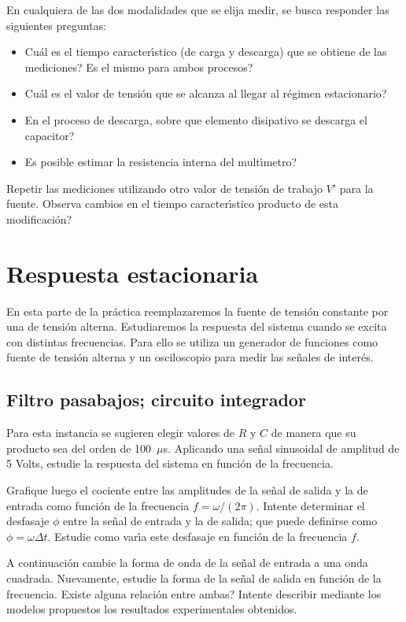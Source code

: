 \documentclass[laboratorio]{guia}
\begin{document}
En cualquiera de las dos modalidades que se elija medir, se busca responder
las siguientes preguntas:
\begin{itemize}
    \item Cu\'al es el tiempo caracter\'\i stico (de carga y descarga) que se 
        obtiene de las  mediciones? Es el mismo para ambos procesos?
    \item Cu\'al es el valor de tensi\'on que se alcanza al llegar al 
        r\'egimen estacionario? 
    \item En el proceso de descarga, sobre que elemento disipativo se 
        descarga el capacitor?
    \item Es posible estimar la resistencia interna del mult\'\i metro? 
\end{itemize}

Repetir las mediciones utilizando otro valor de tensi\'on de trabajo $V'$
para la fuente. Observa cambios en el tiempo caracter\'\i stico producto de
esta modificaci\'on?

\section{Respuesta estacionaria}

En esta parte de la pr\'actica reemplazaremos la fuente de tensi\'on 
constante por una de tensi\'on alterna. Estudiaremos la respuesta del sistema
cuando se excita con distintas frecuencias. Para ello se utiliza un generador
de funciones como fuente de tensi\'on alterna y un osciloscopio para medir
las se\~nales de inter\'es. 

\subsection{Filtro pasabajos; circuito integrador}

Para esta instancia se sugieren elegir valores de $R$ y $C$ de manera que 
su producto sea del orden de 100~$\mu$s. Aplicando una se\~nal sinusoidal de
amplitud de 5 Volts, estudie la respuesta del sistema en funci\'on de la
frecuencia. 

Grafique luego el cociente entre las amplitudes de la se\~nal de salida y
la de entrada como funci\'on de la frecuencia $f = \omega/(2\pi)$. Intente 
determinar el desfasaje $\phi$ entre la se\~nal de entrada y la de salida; que 
puede definirse como $\phi = \omega \Delta t$. Estudie como var\'\i a este 
desfasaje en funci\'on de la frecuencia $f$. 

A continuaci\'on cambie la forma de onda de la se\~nal de entrada a una 
onda cuadrada. Nuevamente, estudie la forma de la se\~nal de salida en 
funci\'on de la frecuencia. Existe alguna relaci\'on entre ambas? Intente
describir mediante los modelos propuestos los resultados experimentales 
obtenidos. 
\end{document}
